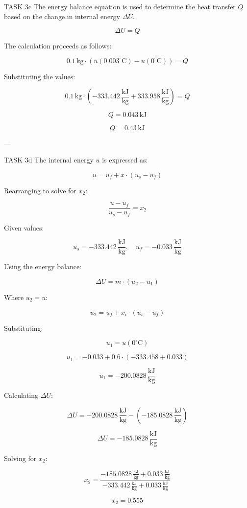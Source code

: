 TASK 3c  
The energy balance equation is used to determine the heat transfer \( Q \) based on the change in internal energy \( \Delta U \).  

\[
\Delta U = Q
\]

The calculation proceeds as follows:  

\[
0.1 \, \text{kg} \cdot \left( u(0.003^\circ\text{C}) - u(0^\circ\text{C}) \right) = Q
\]

Substituting the values:  

\[
0.1 \, \text{kg} \cdot \left( -333.442 \, \frac{\text{kJ}}{\text{kg}} + 333.958 \, \frac{\text{kJ}}{\text{kg}} \right) = Q
\]

\[
Q = 0.043 \, \text{kJ}
\]

\[
Q = 0.43 \, \text{kJ}
\]

---

TASK 3d  
The internal energy \( u \) is expressed as:  

\[
u = u_f + x \cdot (u_s - u_f)
\]

Rearranging to solve for \( x_2 \):  

\[
\frac{u - u_f}{u_s - u_f} = x_2
\]

Given values:  

\[
u_s = -333.442 \, \frac{\text{kJ}}{\text{kg}}, \quad u_f = -0.033 \, \frac{\text{kJ}}{\text{kg}}
\]

Using the energy balance:  

\[
\Delta U = m \cdot (u_2 - u_1)
\]

Where \( u_2 = u \):  

\[
u_2 = u_f + x_i \cdot (u_s - u_f)
\]

Substituting:  

\[
u_1 = u(0^\circ\text{C})
\]

\[
u_1 = -0.033 + 0.6 \cdot (-333.458 + 0.033)
\]

\[
u_1 = -200.0828 \, \frac{\text{kJ}}{\text{kg}}
\]

Calculating \( \Delta U \):  

\[
\Delta U = -200.0828 \, \frac{\text{kJ}}{\text{kg}} - (-185.0828 \, \frac{\text{kJ}}{\text{kg}})
\]

\[
\Delta U = -185.0828 \, \frac{\text{kJ}}{\text{kg}}
\]

Solving for \( x_2 \):  

\[
x_2 = \frac{-185.0828 \, \frac{\text{kJ}}{\text{kg}} + 0.033 \, \frac{\text{kJ}}{\text{kg}}}{-333.442 \, \frac{\text{kJ}}{\text{kg}} + 0.033 \, \frac{\text{kJ}}{\text{kg}}}
\]

\[
x_2 = 0.555
\]